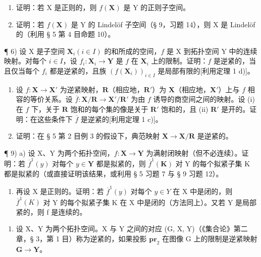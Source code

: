 \begin{enumerate}
\def\labelenumi{\alph{enumi})}
\tightlist
\item
  证明：若 X 是正则的，则 \(f(\mathbf{X})\) 是 Y 的正则子空间。
\item
  证明：若 \(f(\mathbf{X})\) 是 Y 的 Lindelöf 子空间（§ 9，习题 14），则 X 是 Lindelöf 的（利用 § 5 第 4 目命题 10）。
\end{enumerate}

¶ 6) 设 X 是子空间 \(\mathbf{X}_i (i \in I)\) 的和所成的空间，\(f\) 是 X 到拓扑空间 Y 中的连续映射。对每个 \(i \in I\)，设 \(f_i: \mathbf{X}_i \to \mathbf{Y}\) 是 \(f\) 在 \(\mathbf{X}_i\) 上的限制。证明：\(f\) 是逆紧的，当且仅当每个 \(f_i\) 都是逆紧的，且族 \((f(\mathbf{X}_i))_{i \in I}\) 是局部有限的{[}利用定理 1 d){]}。

\begin{enumerate}
\def\labelenumi{\arabic{enumi})}
\setcounter{enumi}{6}
\item
  设 \(f: \mathbf{X} \to \mathbf{X}'\) 为逆紧映射，\(\mathbf{R}\)（相应地，\(\mathbf{R}'\)）为 \(\mathbf{X}\)（相应地，\(\mathbf{X}'\)）上与 \(f\) 相容的等价关系。设 \(\overline{f}: \mathbf{X} / \mathbf{R} \to \mathbf{X}' / \mathbf{R}'\) 为由 \(f\) 诱导的商空间之间的映射。设 (i) 在 \(f\) 下，关于 \(\mathbf{R}\) 饱和的每个集的像是关于 \(\mathbf{R}'\) 饱和的，且 (ii) \(\mathbf{R}'\) 是开的。证明：在这些条件下 \(\overline{f}\) 是逆紧的{[}利用定理 1 c){]}。
\item
  证明：在 § 5 第 2 目例 3 的假设下，典范映射 \(\mathbf{X} \to \mathbf{X} / \mathbf{R}\) 是逆紧的。
\end{enumerate}

¶ 9) a) 设 X、Y 为两个拓扑空间，\(f: \mathbf{X} \to \mathbf{Y}\) 为满射闭映射（但不必连续）。证明：若 \(\overline{f}^{1}(y)\) 对每个 \(y \in \mathbf{Y}\) 都是拟紧的，则 \(\overline{f}^{1}(\mathbf{K})\) 对 Y 的每个拟紧子集 K 都是拟紧的（或直接证明该结果，或利用 § 5 习题 7 与 § 9 习题 12）。

\begin{enumerate}
\def\labelenumi{\alph{enumi})}
\setcounter{enumi}{1}
\tightlist
\item
  再设 X 是正则的。证明：若 \(\overline{f}^{1}(y)\) 对每个 \(y \in Y\) 在 X 中是闭的，则 \(\overline{f}^{1}(K)\) 对 Y 的每个拟紧子集 K 在 X 中是闭的（方法同上）。又若 Y 是局部紧的，则 f 是连续的。
\end{enumerate}

\begin{enumerate}
\def\labelenumi{\arabic{enumi})}
\setcounter{enumi}{9}
\tightlist
\item
  设 X、Y 为两个拓扑空间。X 与 Y 之间的对应 (G, X, Y)（《集合论》第二章，§ 3，第 1 目）称为逆紧的，如果投影 \(\mathbf{pr}_2\) 在图像 G 上的限制是逆紧映射 \(\mathbf{G} \to \mathbf{Y}\)。
\end{enumerate}

